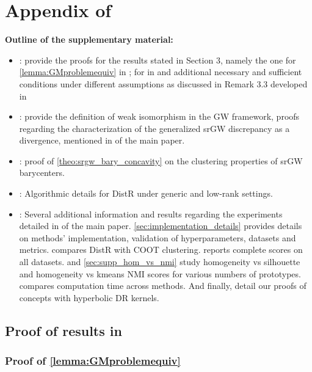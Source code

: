 \chapter{Appendix of }

\minitoc 

\textbf{Outline of the supplementary material:}
\begin{itemize}
	\item {}: provide the proofs for the results stated in Section 3, namely the one for \cref{lemma:GMproblemequiv} in ; for  in   and additional necessary and sufficient conditions under different assumptions as discussed in Remark 3.3 developed in 
	\item {}: provide the definition of weak isomorphism in the GW framework, proofs regarding the characterization of the generalized srGW discrepancy as a divergence, mentioned in  of the main paper.
	\item {}: proof of \cref{theo:srgw_bary_concavity} on the clustering properties of srGW barycenters.
	\item {}: Algorithmic details for DistR under generic and low-rank settings.
	\item {}: Several additional information and results regarding the experiments detailed in  of the main paper. \ref{sec:implementation_details} provides details on methods' implementation, validation of hyperparameters, datasets and metrics.  compares DistR with COOT clustering.  reports complete scores on all datasets.  and \ref{sec:supp_hom_vs_nmi} study homogeneity vs silhouette and homogeneity vs kmeans NMI scores for various numbers of prototypes.  compares computation time across methods. And finally,  detail our proofs of concepts with hyperbolic DR kernels.

\end{itemize}

\section{Proof of results in }\label{sec:DR_as_OT_supp}

\subsection{Proof of \cref{lemma:GMproblemequiv} \label{proof:GMproblemequiv}}

